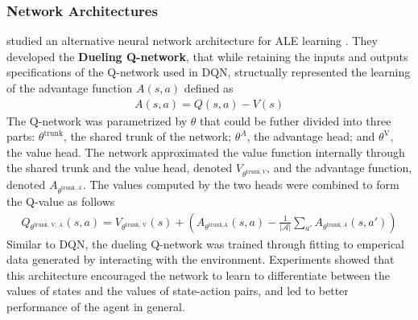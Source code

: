 \subsubsection{Network Architectures}
\citeauthor{DuelingNetworkArchitectures_Wang.Schaul.ea_} studied an alternative neural network architecture for ALE learning \cite{DuelingNetworkArchitectures_Wang.Schaul.ea_}.
They developed the \textbf{Dueling Q-network}, that while retaining the inputs and outputs specifications of the Q-network used in DQN, structually represented the learning of the advantage function $A(s, a)$ defined as
\begin{align*}
    A(s, a) = Q(s, a) - V(s)
\end{align*}
The Q-network was parametrized by $\theta$ that could be futher divided into three parts:
$\theta^\text{trunk}$, the shared trunk of the network; $\theta^A$, the advantage head; and $\theta^\text{V}$, the value head.
The network approximated the value function internally through the shared trunk and the value head, denoted $V_{\theta^{\text{trunk}, V}}$, and the advantage function, denoted $A_{\theta^{\text{trunk}, A}}$.
The values computed by the two heads were combined to form the Q-value as follows
\begin{align*}
    Q_{\theta^{\text{trunk, V, A}}}(s, a)
    = V_{\theta^{\text{trunk, V}}}(s)
    + \left( A_{\theta^{\text{trunk,A}}}(s, a)
    - \frac{1}{| \mathcal{A} | } \sum_{a'}A_{\theta^{\text{trunk},A}}(s, a') \right)
\end{align*}
Similar to DQN, the dueling Q-network was trained through fitting to emperical data generated by interacting with the environment.
Experiments showed that this architecture encouraged the network to learn to differentiate between the values of states and the values of state-action pairs, and led to better performance of the agent in general.

